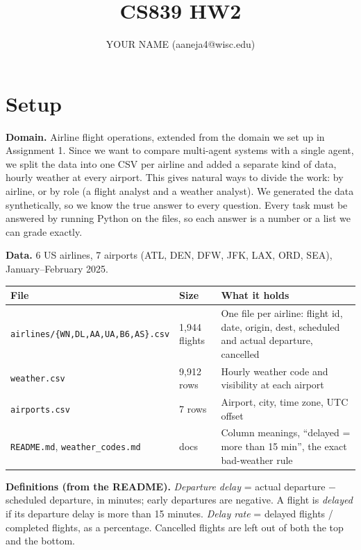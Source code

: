 \documentclass[10pt]{article}
\title{\vspace{-2.2em}CS839 HW2}
\author{YOUR NAME (aaneja4@wisc.edu)}
\date{\vspace{-1.5em}}
\begin{document}
\maketitle

\section{Setup}

\textbf{Domain.} Airline flight operations, extended from the domain we set up in Assignment 1. Since we want
to compare multi-agent systems with a single agent, we split the data into one CSV per airline and added a
separate kind of data, hourly weather at every airport. This gives natural ways to divide the work: by airline,
or by role (a flight analyst and a weather analyst). We generated the data synthetically, so we know the true
answer to every question. Every task must be answered by running Python on the files, so each answer is a
number or a list we can grade exactly.

\textbf{Data.} 6 US airlines, 7 airports (ATL, DEN, DFW, JFK, LAX, ORD, SEA), January--February 2025.

\begin{table}[H]
\centering\small
\begin{tabularx}{\linewidth}{l l Y}
\toprule
File & Size & What it holds \\
\midrule
\texttt{airlines/\{WN,DL,AA,UA,B6,AS\}.csv} & 1,944 flights & One file per airline: flight id, date, origin, dest, scheduled and actual departure, cancelled \\
\texttt{weather.csv} & 9,912 rows & Hourly weather code and visibility at each airport \\
\texttt{airports.csv} & 7 rows & Airport, city, time zone, UTC offset \\
\texttt{README.md}, \texttt{weather\_codes.md} & docs & Column meanings, ``delayed = more than 15 min'', the exact bad-weather rule \\
\bottomrule
\end{tabularx}
\end{table}

\textbf{Definitions (from the README).} \emph{Departure delay} = actual departure $-$ scheduled departure, in
minutes; early departures are negative. A flight is \emph{delayed} if its departure delay is more than 15 minutes.
\emph{Delay rate} = delayed flights / completed flights, as a percentage. Cancelled flights are left out of both
the top and the bottom.
\end{document}
